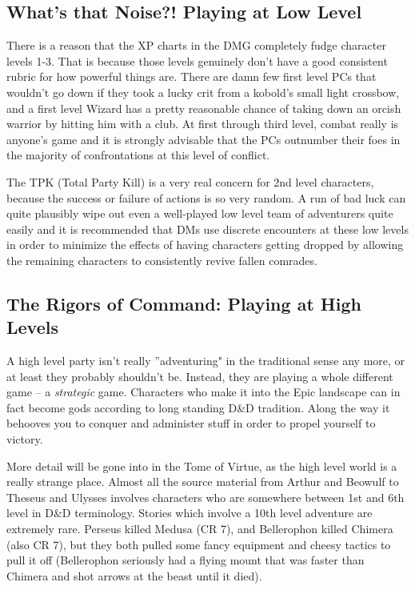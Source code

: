 \subsection{What's that Noise?! Playing at Low Level}

There is a reason that the XP charts in the DMG completely fudge character levels 1-3. That is because those levels genuinely don't have a good consistent rubric for how powerful things are. There are damn few first level PCs that wouldn't go down if they took a lucky crit from a kobold's small light crossbow, and a first level Wizard has a pretty reasonable chance of taking down an orcish warrior by hitting him with a club. At first through third level, combat really is anyone's game and it is strongly advisable that the PCs outnumber their foes in the majority of confrontations at this level of conflict.

The TPK (Total Party Kill) is a very real concern for 2nd level characters, because the success or failure of actions is so very random. A run of bad luck can quite plausibly wipe out even a well-played low level team of adventurers quite easily and it is recommended that DMs use discrete encounters at these low levels in order to minimize the effects of having characters getting dropped by allowing the remaining characters to consistently revive fallen comrades.

\subsection{The Rigors of Command: Playing at High Levels}

A high level party isn't really ''adventuring" in the traditional sense any more, or at least they probably shouldn't be. Instead, they are playing a whole different game -- a \textit{strategic} game. Characters who make it into the Epic landscape can in fact become gods according to long standing D\&D tradition. Along the way it behooves you to conquer and administer stuff in order to propel yourself to victory.

More detail will be gone into in the Tome of Virtue, as the high level world is a really strange place. Almost all the source material from Arthur and Beowulf to Theseus and Ulysses involves characters who are somewhere between 1st and 6th level in D\&D terminology. Stories which involve a 10th level adventure are extremely rare. Perseus killed Medusa (CR 7), and Bellerophon killed Chimera (also CR 7), but they both pulled some fancy equipment and cheesy tactics to pull it off (Bellerophon seriously had a flying mount that was faster than Chimera and shot arrows at the beast until it died).

